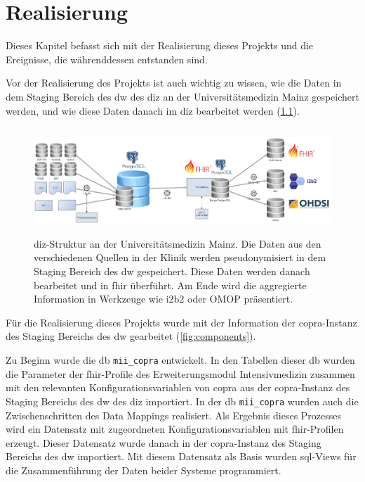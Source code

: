 \chapter{Realisierung} \label{ch:results}

Dieses Kapitel befasst sich mit der Realisierung dieses Projekts und die Ereignisse, die währenddessen entstanden sind.


Vor der Realisierung des Projekts ist auch wichtig zu wissen, wie die Daten in dem Staging Bereich des \ac{dw} des \ac{diz} an der Universitätsmedizin Mainz gespeichert werden, und wie diese Daten danach im \ac{diz} bearbeitet werden (\ref{fig:dizummz}).

\begin{figure}[ht]
	\centering
	\includegraphics[height=4cm]{figures/diz_ummz}
	\caption[\acs{diz}-Struktur an der Universitätsmedizin Mainz] {\acs{diz}-Struktur an der Universitätsmedizin Mainz. Die Daten aus den verschiedenen Quellen in der Klinik werden pseudonymisiert in dem Staging Bereich des \ac{dw} gespeichert. Diese Daten werden danach bearbeitet und in \ac{fhir} überführt. Am Ende wird die aggregierte Information in Werkzeuge wie i2b2 oder OMOP präsentiert.}
	\label{fig:dizummz}
\end{figure}

Für die Realisierung dieses Projekts wurde mit der Information der \ac{copra}-Instanz des Staging Bereichs des \ac{dw} gearbeitet (\ref{fig:components}).

 Zu Beginn wurde die \ac{db} \texttt{mii\_copra} entwickelt. In den Tabellen dieser \ac{db} wurden die Parameter der \ac{fhir}-Profile des Erweiterungsmodul \glqq Intensivmedizin\grqq{} zusammen mit den relevanten Konfigurationsvariablen von \ac{copra} aus der \ac{copra}-Instanz des Staging Bereichs des \ac{dw} des \ac{diz} importiert. In der \ac{db} \texttt{mii\_copra} wurden auch die Zwischenschritten des Data Mappings realisiert. Als Ergebnis dieses Prozesses wird ein Datensatz mit zugeordneten Konfigurationsvariablen mit \ac{fhir}-Profilen erzeugt. Dieser Datensatz wurde danach in der \ac{copra}-Instanz des Staging Bereichs des \ac{dw} importiert. Mit diesem Datensatz als Basis wurden \ac{sql}-Views für die Zusammenführung der Daten beider Systeme programmiert.

